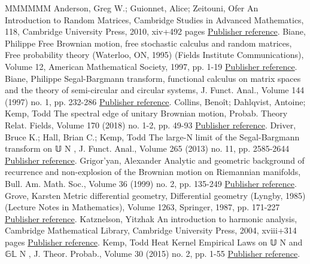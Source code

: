 \begin{thebibliography}{MMMMMM}
 Anderson, Greg W.; Guionnet, Alice; Zeitouni, Ofer An Introduction to Random Matrices, Cambridge Studies in Advanced Mathematics, 118, Cambridge University Press, 2010, xiv+492 pages \href{https://ahl.centre-mersenne.org/item/AHL_2018__1__247_0/#AGZ}{Publisher reference}.
 Biane, Philippe Free Brownian motion, free stochastic calculus and random matrices, Free probability theory (Waterloo, ON, 1995) (Fields Institute Communications), Volume 12, American Mathematical Society, 1997, pp. 1-19 \href{https://ahl.centre-mersenne.org/item/AHL_2018__1__247_0/#Biane1997}{Publisher reference}.
 Biane, Philippe Segal-Bargmann transform, functional calculus on matrix spaces and the theory of semi-circular and circular systems, J. Funct. Anal., Volume 144 (1997) no. 1, pp. 232-286 \href{https://ahl.centre-mersenne.org/item/AHL_2018__1__247_0/#Biane1997-2}{Publisher reference}.
 Collins, Benoît; Dahlqvist, Antoine; Kemp, Todd The spectral edge of unitary Brownian motion, Probab. Theory Relat. Fields, Volume 170 (2018) no. 1-2, pp. 49-93 \href{https://ahl.centre-mersenne.org/item/AHL_2018__1__247_0/#CDK2016}{Publisher reference}.
 Driver, Bruce K.; Hall, Brian C.; Kemp, Todd The large-N limit of the Segal-Bargmann transform on 𝕌 N , J. Funct. Anal., Volume 265 (2013) no. 11, pp. 2585-2644 \href{https://ahl.centre-mersenne.org/item/AHL_2018__1__247_0/#DHK2013}{Publisher reference}.
 Grigor’yan, Alexander Analytic and geometric background of recurrence and non-explosion of the Brownian motion on Riemannian manifolds, Bull. Am. Math. Soc., Volume 36 (1999) no. 2, pp. 135-249 \href{https://ahl.centre-mersenne.org/item/AHL_2018__1__247_0/#Grigoryan1999}{Publisher reference}.
 Grove, Karsten Metric differential geometry, Differential geometry (Lyngby, 1985) (Lecture Notes in Mathematics), Volume 1263, Springer, 1987, pp. 171-227 \href{https://ahl.centre-mersenne.org/item/AHL_2018__1__247_0/#Grove1987}{Publisher reference}.
 Katznelson, Yitzhak An introduction to harmonic analysis, Cambridge Mathematical Library, Cambridge University Press, 2004, xviii+314 pages \href{https://ahl.centre-mersenne.org/item/AHL_2018__1__247_0/#Katznelson2004}{Publisher reference}.
 Kemp, Todd Heat Kernel Empirical Laws on 𝕌 N  and 𝔾𝕃 N , J. Theor. Probab., Volume 30 (2015) no. 2, pp. 1-55 \href{https://ahl.centre-mersenne.org/item/AHL_2018__1__247_0/#Kemp2015}{Publisher reference}.

\end{thebibliography}
